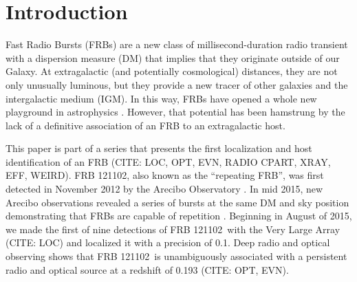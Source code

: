 \documentclass[twocolumn]{aastex61}
\newcommand{\frb}{FRB 121102}
\begin{document}
\begin{abstract}
The millisecond radio transients known as Fast Radio Bursts have recently emerged as a mysterious, new class of astrophysical transient. The discovery of repeating bursts from \frb\ has shown that at least some FRBs are not cataclysmic and opened potential for studying FRB properties via a homogenous sample of bursts. The recent localization of \frb\ with the Very Large Array has helped measure its distance and a host of intrinsic properties. This localization was made with 9 bursts seen by the VLA in coordination the Arecibo, Effelsberg, and AMI-LA observatories. We present a detailed analysis of these bursts, including the first simultaneous detection of an FRB with multiple telescopes. We show that the burst spectra typically have a broad Gaussian shape on the scale of $\sim500$~MHz with fine spectral structure consistent with either scintillation or unresolved temporal structure. We present the luminosity distribution and temporal statistics for \frb\ and argue that the whole FRB population is adequately described by a single class similar to \frb. We close with thoughts on optimal strategies to make new interferometric localizations of FRBs.
\end{abstract}

\section{Introduction}
Fast Radio Bursts (FRBs) are a new class of millisecond-duration radio transient with a dispersion measure (DM) that implies that they originate outside of our Galaxy. At extragalactic (and potentially cosmological) distances, they are not only unusually luminous, but they provide a new tracer of other galaxies and the intergalactic medium (IGM). In this way, FRBs have opened a whole new playground in astrophysics \citep[e.g.,][]{2014A&A...562A.137F, 2014ApJ...780L..33M, 2016MNRAS.457..232C}. However, that potential has been hamstrung by the lack of a definitive association of an FRB to an extragalactic host.

This paper is part of a series that presents the first localization and host identification of an FRB (CITE: LOC, OPT, EVN, RADIO CPART, XRAY, EFF, WEIRD). \frb, also known as the ``repeating FRB'', was first detected in November 2012 by the Arecibo Observatory \citep{2014ApJ...790..101S}. In mid 2015, new Arecibo observations revealed a series of bursts at the same DM and sky position demonstrating that FRBs are capable of repetition \citep{2016Natur.531..202S}. Beginning in August of 2015, we made the first of nine detections of \frb\ with the Very Large Array (CITE: LOC) and localized it with a precision of 0.1\arcsec. Deep radio and optical observing shows that \frb\ is unambiguously associated with a persistent radio and optical source at a redshift of 0.193 (CITE: OPT, EVN).
\end{document}
